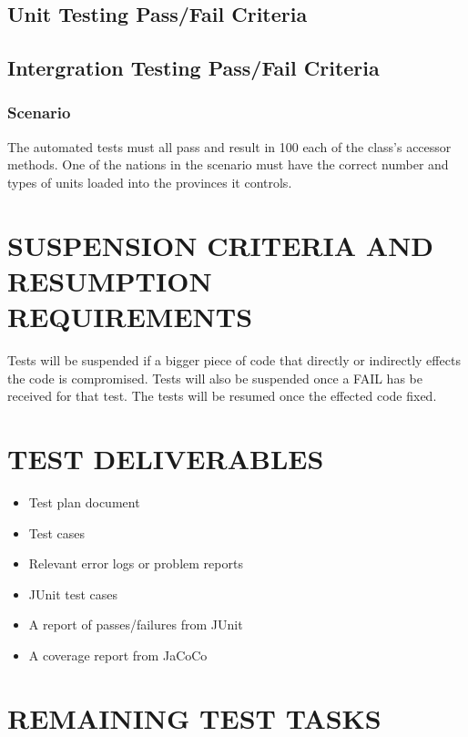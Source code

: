 {{\subsection{Unit Testing Pass/Fail Criteria}
\subsection{Intergration Testing Pass/Fail Criteria}
\subsubsection{Scenario}
The automated tests must all pass and result in 100%
each of the class's accessor methods. One of the nations in the scenario must 
have the correct number and types of units loaded into the provinces it controls.




\section[SUSPENSION CRITERIA]{\bfseries\color{black}
	 SUSPENSION CRITERIA AND RESUMPTION REQUIREMENTS}
{\color{black}

{\color{black}
Tests will be suspended if a bigger piece of code that directly or indirectly effects the code is compromised. Tests will also be suspended once a FAIL has be received for that test. The tests will be resumed once the effected code fixed. 
}

\section[TEST DELIVERABLES]{\bfseries\color{black} TEST DELIVERABLES}

{\color{black}
\begin{itemize}
\item Test plan document
\item Test cases
\item Relevant error logs or problem reports
\item JUnit test cases
\item A report of passes/failures from JUnit
\item A coverage report from JaCoCo
\end{itemize}
}

\section[REMAINING TEST TASKS]{\bfseries\color{black} REMAINING TEST TASKS}

}}}
